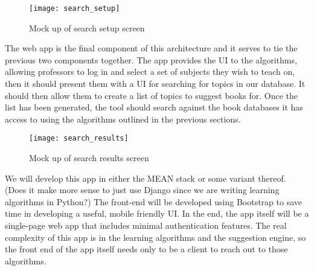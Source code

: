 
\begin{figure}[ht]
\label{solution:mockup_search}
\caption{Mock up of search setup screen}
\centering
\texttt{[image: search\_setup]}
\end{figure}

The web app is the final component of this architecture and it serves to tie the previous two components together.
The app provides the UI to the algorithms, allowing professors to log in and select a set of subjects they wish to teach on, then it should present them with a UI for searching for topics in our database.  
It should then allow them to create a list of topics to suggest books for.
Once the list has been generated, the tool should search against the book databases it has access to using the algorithms outlined in the previous sections.

\begin{figure}[ht]
\label{solution:mockup_search}
\caption{Mock up of search results screen}
\centering
\texttt{[image: search\_results]}
\end{figure}

We will develop this app in either the MEAN stack or some variant thereof.  (Does it make more sense to just use Django since we are writing learning algorithms in Python?)
The front-end will be developed using Bootstrap to save time in developing a useful, mobile friendly UI.
In the end, the app itself will be a single-page web app that includes minimal authentication features.  
The real complexity of this app is in the learning algorithms and the suggestion engine, so the front end of the app itself needs only to be a client to reach out to those algorithms.  